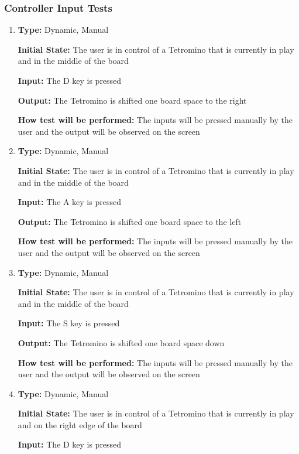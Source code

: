 \documentclass[12pt, titlepage]{article}
\begin{document}
	\subsubsection{Controller Input Tests}
	\begin{enumerate}[{FR-CI-}1. ]
		\item
		\textbf{Type:} Dynamic, Manual
		
		\textbf{Initial State:} The user is in control of a Tetromino that is currently in play and in the middle of the board
		
		\textbf{Input:} The D key is pressed 
		
		\textbf{Output:} The Tetromino is shifted one board space to the right
		
		\textbf{How test will be performed:} The inputs will be pressed manually by the user and the output will be observed on the screen
		
		\item
		\textbf{Type:} Dynamic, Manual
		
		\textbf{Initial State:} The user is in control of a Tetromino that is currently in play and in the middle of the board
		
		\textbf{Input:} The A key is pressed 
		
		\textbf{Output:} The Tetromino is shifted one board space to the left
		
		\textbf{How test will be performed:} The inputs will be pressed manually by the user and the output will be observed on the screen
		
		\item
		\textbf{Type:} Dynamic, Manual
		
		\textbf{Initial State:} The user is in control of a Tetromino that is currently in play and in the middle of the board
		
		\textbf{Input:} The S key is pressed 
		
		\textbf{Output:} The Tetromino is shifted one board space down
		
		\textbf{How test will be performed:} The inputs will be pressed manually by the user and the output will be observed on the screen
		
		\item
		\textbf{Type:} Dynamic, Manual
		
		\textbf{Initial State:} The user is in control of a Tetromino that is currently in play and on the right edge of the board
		
		\textbf{Input:} The D key is pressed 
		

\end{enumerate}
\end{document}
